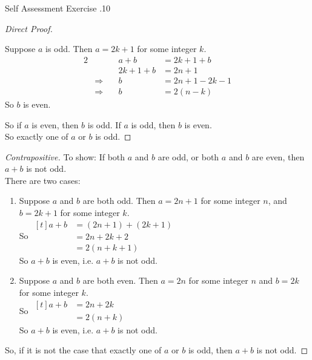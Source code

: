 \documentclass[\main/notes.tex]{subfiles}
\begin{document}
\begin{exercise}{Self Assessment Exercise \thechapter.10}
\begin{questions}
\begin{questions}
\begin{answer}
\begin{proof}[Direct Proof]
\begin{enumerate}[label=(\roman*)]
													Suppose $a$ is odd. Then $a = 2k + 1$ for some integer $k$. 
													\begin{alignat*}{2}
														& & a + b &= 2k + 1 + b\\
														& & 2k + 1 + b &= 2n + 1\\
														& \Rightarrow \quad &b &= 2n + 1 - 2k - 1\\
														& \Rightarrow \quad &b &= 2(n - k)
													\end{alignat*}
													So $b$ is even.
											\end{enumerate}
											So if $a$ is even, then $b$ is odd. If $a$ is odd, then $b$ is even.\\
											So exactly one of $a$ or $b$ is odd.
										\end{proof}
										\begin{proof}[Contrapositive]
											To show: If both $a$ and $b$ are odd, or both $a$ and $b$ are even, then $a + b$ is not odd.\\
											There are two cases:
											\begin{enumerate}[label=(\roman*)]
												\item Suppose $a$ and $b$ are both odd. Then $a = 2n + 1$ for some integer $n$, and $b = 2k + 1$ for some integer $k$.\\
													So $ \begin{aligned}[t]
														a + b &= (2n + 1) + (2k + 1)\\
														&= 2n + 2k + 2\\
														&= 2(n + k + 1)
													\end{aligned}$\\
													So $a + b$ is even, i.e. $a + b$ is not odd.
												\item Suppose $a$ and $b$ are both even. Then $a = 2n$ for some integer $n$ and $b = 2k$ for some integer $k$.\\
													So $ \begin{aligned}[t]
														a + b &= 2n + 2k\\
														&= 2(n + k)
													\end{aligned}$\\
													So $a + b$ is even, i.e. $a + b$ is not odd.
											\end{enumerate}
											So, if it is not the case that exactly one of $a$ or $b$ is odd, then $a + b$ is not odd.
										\end{proof}

\end{answer}
\end{questions}
\end{questions}
\end{exercise}
\end{document}
